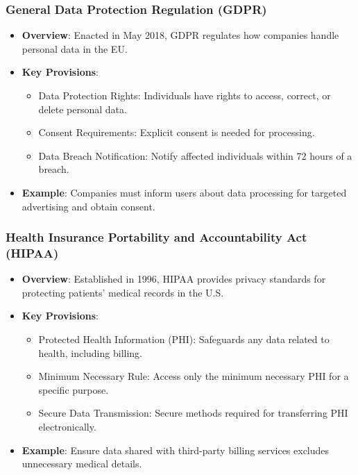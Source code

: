 \documentclass{beamer}
\begin{document}
\begin{frame}[fragile]
    \frametitle{General Data Protection Regulation (GDPR)}
    \begin{itemize}
        \item \textbf{Overview}: Enacted in May 2018, GDPR regulates how companies handle personal data in the EU.
        \item \textbf{Key Provisions}:
        \begin{itemize}
            \item Data Protection Rights: Individuals have rights to access, correct, or delete personal data.
            \item Consent Requirements: Explicit consent is needed for processing.
            \item Data Breach Notification: Notify affected individuals within 72 hours of a breach.
        \end{itemize}
        \item \textbf{Example}: Companies must inform users about data processing for targeted advertising and obtain consent.
    \end{itemize}
\end{frame}

\begin{frame}[fragile]
    \frametitle{Health Insurance Portability and Accountability Act (HIPAA)}
    \begin{itemize}
        \item \textbf{Overview}: Established in 1996, HIPAA provides privacy standards for protecting patients' medical records in the U.S.
        \item \textbf{Key Provisions}:
        \begin{itemize}
            \item Protected Health Information (PHI): Safeguards any data related to health, including billing.
            \item Minimum Necessary Rule: Access only the minimum necessary PHI for a specific purpose.
            \item Secure Data Transmission: Secure methods required for transferring PHI electronically.
        \end{itemize}
        \item \textbf{Example}: Ensure data shared with third-party billing services excludes unnecessary medical details.
    \end{itemize}
\end{frame}
\end{document}
